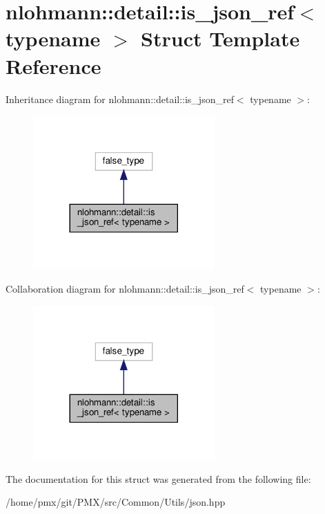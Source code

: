 \hypertarget{structnlohmann_1_1detail_1_1is__json__ref}{}\section{nlohmann\+:\+:detail\+:\+:is\+\_\+json\+\_\+ref$<$ typename $>$ Struct Template Reference}
\label{structnlohmann_1_1detail_1_1is__json__ref}


Inheritance diagram for nlohmann\+:\+:detail\+:\+:is\+\_\+json\+\_\+ref$<$ typename $>$\+:
\nopagebreak
\begin{figure}[H]
\begin{center}
\leavevmode
\includegraphics[width=197pt]{structnlohmann_1_1detail_1_1is__json__ref__inherit__graph}
\end{center}
\end{figure}


Collaboration diagram for nlohmann\+:\+:detail\+:\+:is\+\_\+json\+\_\+ref$<$ typename $>$\+:
\nopagebreak
\begin{figure}[H]
\begin{center}
\leavevmode
\includegraphics[width=197pt]{structnlohmann_1_1detail_1_1is__json__ref__coll__graph}
\end{center}
\end{figure}


The documentation for this struct was generated from the following file\+:\begin{DoxyCompactItemize}
\item 
/home/pmx/git/\+P\+M\+X/src/\+Common/\+Utils/json.\+hpp\end{DoxyCompactItemize}
